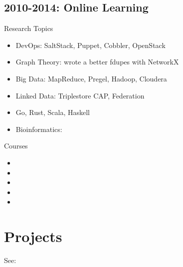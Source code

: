 \documentclass[letter,,openany,oneside,english]{sphinxhowto}
\begin{document}
\subsection{2010-2014: Online Learning}
\label{\detokenize{resume:nebraska-humane-society-nonprofit-consulting}}\label{\detokenize{resume:online-learning}}\label{\detokenize{resume:id2}}
Research Topics
\begin{itemize}
\item {} 
DevOps: SaltStack, Puppet, Cobbler, OpenStack

\item {} 
Graph Theory: wrote a better fdupes with NetworkX

\item {} 
Big Data: MapReduce, Pregel, Hadoop, Cloudera

\item {} 
Linked Data: Triplestore CAP, Federation

\item {} 
Go, Rust, Scala, Haskell

\item {} 
Bioinformatics: 

\end{itemize}

Courses
\begin{itemize}
\item {} 

\item {} 

\item {} 

\item {} 

\item {} 

\end{itemize}


\section{Projects}
\label{\detokenize{resume:projects}}
See: 
\end{document}
